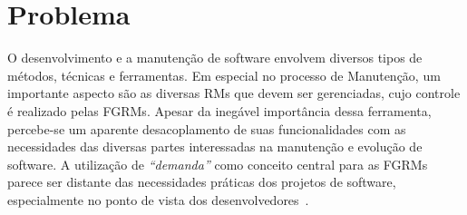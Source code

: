 %

%

\section{Problema}
\label{sec:intro-problema}

O desenvolvimento e a manutenção de software envolvem diversos tipos de métodos,
técnicas e ferramentas. Em especial no processo de Manutenção, um importante
aspecto são as diversas RMs que devem ser gerenciadas, cujo controle é realizado
pelas FGRMs. Apesar da inegável importância dessa ferramenta, percebe-se um
aparente desacoplamento de suas funcionalidades com as necessidades das diversas
partes interessadas na manutenção e evolução de software. A utilização de
\textit{``demanda''} como conceito central para as FGRMs parece ser distante das
necessidades práticas dos projetos de software, especialmente no ponto de vista
dos desenvolvedores~\cite{Baysal:2013:SAP:2486788.2486957}.

